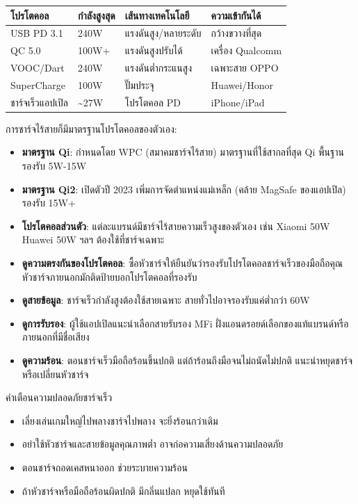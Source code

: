 
\begin{center}
\begin{tabularx}{\linewidth}{|X|X|X|X|}
\hline
\textbf{โปรโตคอล} & \textbf{กำลังสูงสุด} & \textbf{เส้นทางเทคโนโลยี} & \textbf{ความเข้ากันได้} \tabularnewline
\hline
USB PD 3.1 & 240W & แรงดันสูง/หลายระดับ & กว้างขวางที่สุด \tabularnewline
QC 5.0 & 100W+ & แรงดันสูงปรับได้ & เครื่อง Qualcomm \tabularnewline
VOOC/Dart & 240W & แรงดันต่ำกระแนสูง & เฉพาะสาย OPPO \tabularnewline
SuperCharge & 100W & ปั๊มประจุ & Huawei/Honor \tabularnewline
ชาร์จเร็วแอปเปิล & \textasciitilde{}27W & โปรโตคอล PD & iPhone/iPad \tabularnewline
\hline
\end{tabularx}
\end{center}


การชาร์จไร้สายก็มีมาตรฐานโปรโตคอลของตัวเอง:

\begin{itemize}
  \item \textbf{มาตรฐาน Qi}: กำหนดโดย WPC (สมาคมชาร์จไร้สาย) มาตรฐานที่ใช้สากลที่สุด Qi พื้นฐานรองรับ 5W-15W
  \item \textbf{มาตรฐาน Qi2}: เปิดตัวปี 2023 เพิ่มการจัดตำแหน่งแม่เหล็ก (คล้าย MagSafe ของแอปเปิล) รองรับ 15W+
  \item \textbf{โปรโตคอลส่วนตัว}: แต่ละแบรนด์มีชาร์จไร้สายความเร็วสูงของตัวเอง เช่น Xiaomi 50W Huawei 50W ฯลฯ ต้องใช้ที่ชาร์จเฉพาะ
\end{itemize}


\begin{itemize}
  \item \textbf{ดูความตรงกันของโปรโตคอล}: ซื้อหัวชาร์จให้ยืนยันว่ารองรับโปรโตคอลชาร์จเร็วของมือถือคุณ หัวชาร์จภายนอกมักติดป้ายบอกโปรโตคอลที่รองรับ
  \item \textbf{ดูสายข้อมูล}: ชาร์จเร็วกำลังสูงต้องใช้สายเฉพาะ สายทั่วไปอาจรองรับแค่ต่ำกว่า 60W
  \item \textbf{ดูการรับรอง}: ผู้ใช้แอปเปิลแนะนำเลือกสายรับรอง MFi ฝั่งแอนดรอยด์เลือกของแท้แบรนด์หรือภายนอกที่มีชื่อเสียง
  \item \textbf{ดูความร้อน}: ตอนชาร์จเร็วมือถือร้อนขึ้นปกติ แต่ถ้าร้อนถึงมือจนไม่ถนัดไม่ปกติ แนะนำหยุดชาร์จหรือเปลี่ยนหัวชาร์จ
\end{itemize}

\begin{tcbwarn}{คำเตือนความปลอดภัยชาร์จเร็ว}
\begin{itemize}
  \item เลี่ยงเล่นเกมใหญ่ไปพลางชาร์จไปพลาง จะยิ่งร้อนกว่าเดิม
  \item อย่าใช้หัวชาร์จและสายข้อมูลคุณภาพต่ำ อาจก่อความเสี่ยงด้านความปลอดภัย
  \item ตอนชาร์จถอดเคสหนาออก ช่วยระบายความร้อน
  \item ถ้าหัวชาร์จหรือมือถือร้อนผิดปกติ มีกลิ่นแปลก หยุดใช้ทันที
\end{itemize}

\end{tcbwarn}


